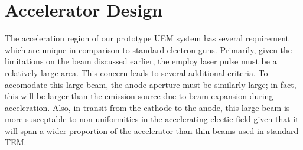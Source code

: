 
\section{Accelerator Design} \label{sec:gun_design}

The acceleration region of our prototype UEM system has several requirement which are unique in comparison to standard electron guns.
Primarily, given the limitations on the beam discussed earlier, %
the employ laser pulse must be a relatively large area.
This concern leads to several additional criteria.
To accomodate this large beam, the anode aperture must be similarly large; in fact, this will be larger than the emission source due to beam expansion during acceleration.
Also, in transit from the cathode to the anode, this large beam is more susceptable to non-uniformities in the accelerating electic field given that it will span a wider proportion of the accelerator than thin beams used in standard TEM.

